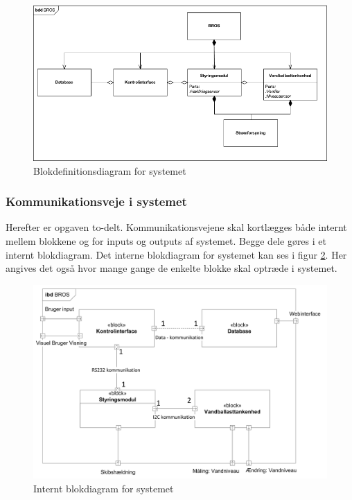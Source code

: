 \begin{figure}[htbp]
\centering
\includegraphics[scale=0.5]{billeder/Systemarkitektur/bdd_bros}
\caption{Blokdefinitionsdiagram for systemet}
\label{fig:bdd_bros}
\end{figure}

\subsubsection{Kommunikationsveje i systemet}
Herefter er opgaven to-delt. Kommunikationsvejene skal kortlægges både internt mellem blokkene og for inputs og outputs af systemet. Begge dele gøres i et internt blokdiagram. Det interne blokdiagram for systemet kan ses i figur \ref{fig:idb_bros}. Her angives det også hvor mange gange de enkelte blokke skal optræde i systemet.\\

\begin{figure}[H]
\centering
\includegraphics[scale=0.8]{billeder/Systemarkitektur/ibd_bros}
\caption{Internt blokdiagram for systemet}
\label{fig:idb_bros}
\end{figure}

